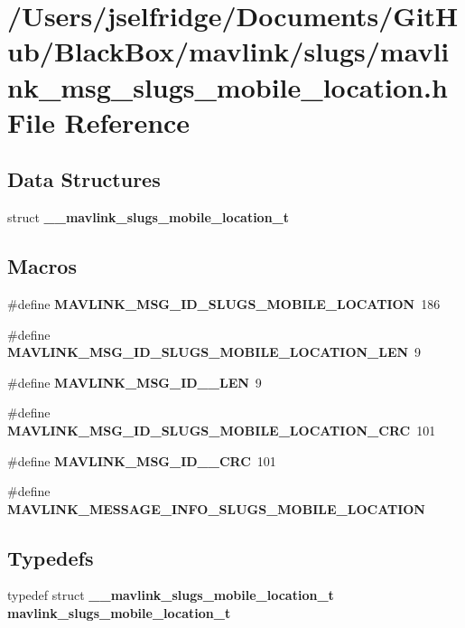 \section{/\+Users/jselfridge/\+Documents/\+Git\+Hub/\+Black\+Box/mavlink/slugs/mavlink\+\_\+msg\+\_\+slugs\+\_\+mobile\+\_\+location.h File Reference}
\label{mavlink__msg__slugs__mobile__location_8h}
\subsection*{Data Structures}
\begin{DoxyCompactItemize}
\item 
struct \textbf{ \+\_\+\+\_\+mavlink\+\_\+slugs\+\_\+mobile\+\_\+location\+\_\+t}
\end{DoxyCompactItemize}
\subsection*{Macros}
\begin{DoxyCompactItemize}
\item 
\#define \textbf{ M\+A\+V\+L\+I\+N\+K\+\_\+\+M\+S\+G\+\_\+\+I\+D\+\_\+\+S\+L\+U\+G\+S\+\_\+\+M\+O\+B\+I\+L\+E\+\_\+\+L\+O\+C\+A\+T\+I\+ON}~186
\item 
\#define \textbf{ M\+A\+V\+L\+I\+N\+K\+\_\+\+M\+S\+G\+\_\+\+I\+D\+\_\+\+S\+L\+U\+G\+S\+\_\+\+M\+O\+B\+I\+L\+E\+\_\+\+L\+O\+C\+A\+T\+I\+O\+N\+\_\+\+L\+EN}~9
\item 
\#define \textbf{ M\+A\+V\+L\+I\+N\+K\+\_\+\+M\+S\+G\+\_\+\+I\+D\+\_\+\_\+\+L\+EN}~9
\item 
\#define \textbf{ M\+A\+V\+L\+I\+N\+K\+\_\+\+M\+S\+G\+\_\+\+I\+D\+\_\+\+S\+L\+U\+G\+S\+\_\+\+M\+O\+B\+I\+L\+E\+\_\+\+L\+O\+C\+A\+T\+I\+O\+N\+\_\+\+C\+RC}~101
\item 
\#define \textbf{ M\+A\+V\+L\+I\+N\+K\+\_\+\+M\+S\+G\+\_\+\+I\+D\+\_\+\_\+\+C\+RC}~101
\item 
\#define \textbf{ M\+A\+V\+L\+I\+N\+K\+\_\+\+M\+E\+S\+S\+A\+G\+E\+\_\+\+I\+N\+F\+O\+\_\+\+S\+L\+U\+G\+S\+\_\+\+M\+O\+B\+I\+L\+E\+\_\+\+L\+O\+C\+A\+T\+I\+ON}
\end{DoxyCompactItemize}
\subsection*{Typedefs}
\begin{DoxyCompactItemize}
\item 
typedef struct \textbf{ \+\_\+\+\_\+mavlink\+\_\+slugs\+\_\+mobile\+\_\+location\+\_\+t} \textbf{ mavlink\+\_\+slugs\+\_\+mobile\+\_\+location\+\_\+t}
\end{DoxyCompactItemize}


